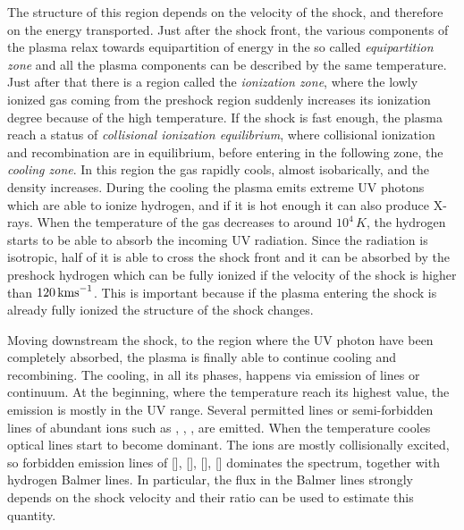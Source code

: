 \documentclass[../main.tex]{subfiles}
\begin{document}
The structure of this region depends on the velocity of the shock, and therefore on the energy transported.
Just after the shock front, the various components of the plasma relax towards equipartition of energy in the so called \emph{equipartition zone} and all the plasma components can be described by the same temperature.
Just after that there is a region called the \emph{ionization zone}, where the lowly ionized gas coming from the preshock region suddenly increases its ionization degree because of the high temperature. 
If the shock is fast enough, the plasma reach a status of \emph{collisional ionization equilibrium}, where collisional ionization and recombination are in equilibrium, before entering in the following zone, the \emph{cooling zone}.
In this region the gas rapidly cools, almost isobarically, and the density increases.
During the cooling the plasma emits extreme UV photons which are able to ionize hydrogen, and if it is hot enough it can also produce X-rays.
When the temperature of the gas decreases to around $10^4\,\si{K}$, the hydrogen starts to be able to absorb the incoming UV radiation.
Since the radiation is isotropic, half of it is able to cross the shock front and it can be absorbed by the preshock hydrogen which can be fully ionized if the velocity of the shock is higher than $120\,\si{\kms}$.
This is important because if the plasma entering the shock is already fully ionized the structure of the shock changes.

Moving downstream the shock, to the region where the UV photon have been completely absorbed, the plasma is finally able to continue cooling and recombining.
The cooling, in all its phases, happens via emission of lines or continuum.
At the beginning, where the temperature reach its highest value, the emission is mostly in the UV range.
Several permitted lines or semi-forbidden lines of abundant ions such as , , ,  are emitted.
When the temperature cooles optical lines start to become dominant.
The ions are mostly collisionally excited, so forbidden emission lines of [], [], [], [] dominates the spectrum, together with hydrogen Balmer lines.
In particular, the flux in the Balmer lines strongly depends on the shock velocity and their ratio can be used to estimate this quantity.







\biblio
\end{document}
